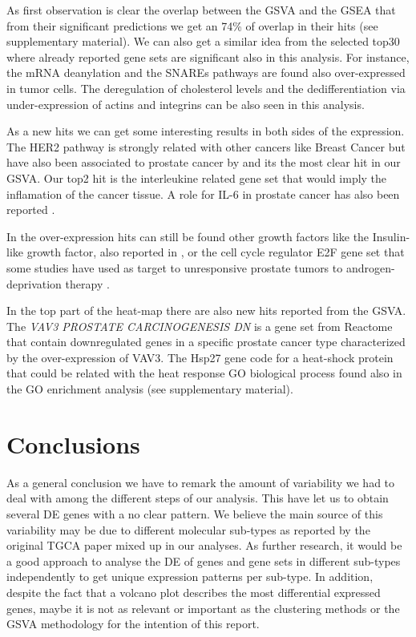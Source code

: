 \documentclass[9pt,twocolumn,twoside]{gsajnl}
\begin{document}
As first observation is clear the overlap between the GSVA and the GSEA that from their significant predictions we get an 74\% of overlap in their hits (see supplementary material). We can also get a similar idea from the selected top30 where already reported gene sets are significant also in this analysis. For instance, the mRNA deanylation and the SNAREs pathways are found also over-expressed in tumor cells. The deregulation of cholesterol levels and the dedifferentiation via under-expression of actins and integrins can be also seen in this analysis.

As a new hits we can get some interesting results in both sides of the expression. The HER2 pathway is strongly related with other cancers like Breast Cancer but have also been associated to prostate cancer by \cite{yeh1999her2} and its the most clear hit in our GSVA. Our top2 hit is the interleukine related gene set that would imply the inflamation of the cancer tissue. A role for IL-6 in prostate cancer has also been reported \citep{chung1999characterization}.

In the over-expression hits can still be found other growth factors like the Insulin-like growth factor, also reported in \cite{hellawell2002expression}, or the cell cycle regulator E2F gene set that some studies have used as target to unresponsive prostate tumors to androgen-deprivation therapy \citep{kaseb2007androgen}.

In the top part of the heat-map there are also new hits reported from the GSVA. The  \textit{VAV3 PROSTATE CARCINOGENESIS DN} \citep{liu2008targeted} is a gene set from Reactome that contain downregulated genes in a specific prostate cancer type characterized by the over-expression of VAV3. The Hsp27 gene code for a heat-shock protein that could be related with the heat response GO biological process found also in the GO enrichment analysis (see supplementary material).



\section*{Conclusions}

As a general conclusion we have to remark the amount of variability we had to deal with among the different steps of our analysis. This have let us to obtain several DE genes with a no clear pattern. We believe the main source of this variability may be due to different molecular sub-types as reported by the original TGCA paper \citep{Abeshouse2015} mixed up in our analyses.  As further research, it would be a good approach to analyse the DE of genes and gene sets in different sub-types independently to get unique expression patterns per sub-type. In addition, despite the fact that a volcano plot describes the most differential expressed genes, maybe it is not as relevant or important as the clustering methods or the GSVA methodology for the intention of this report.
\end{document}

